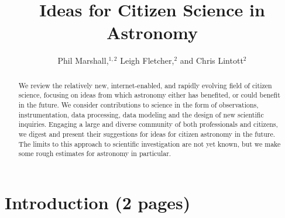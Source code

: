 \documentclass{ar2e}
\begin{document}

\jvol{}
\ARinfo{}

\title{Ideas for Citizen Science in Astronomy}

\author{Phil Marshall,$^{1,2}$
Leigh Fletcher,$^{2}$ and
Chris Lintott$^{2}$
}




\begin{abstract} 

We review the relatively new, internet-enabled, and rapidly evolving field of
citizen science, focusing on ideas from which astronomy either has benefited, or
could benefit in the future. We consider contributions to science in the form of
observations, instrumentation, data processing, data modeling and the design of
new scientific inquiries. Engaging a large and diverse community of both
professionals and citizens, we digest and present their suggestions for ideas
for citizen astronomy in the future. The limits to this approach to scientific
investigation are not yet known, but we make some rough estimates for astronomy
in particular.

\end{abstract}

\maketitle


\section{Introduction (2 pages)}
\label{sec:intro}
\end{document}
